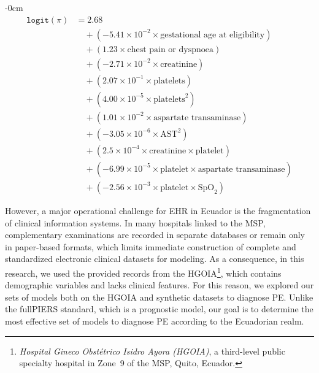 \documentclass[diagnostics,article,submit,pdftex,moreauthors]{Definitions/mdpi}
\begin{document}
\begin{linenomath}
\begin{adjustwidth}{-\extralength}{0cm}
\begin{equation}
  \begin{aligned}
    \texttt{logit}(\pi) &= 2.68 \\
              &\quad + (-5.41 \times 10^{-2} \times \text{gestational age at eligibility}) \\
              &\quad + (1.23 \times \text{chest pain or dyspnoea}) \\
              &\quad + (-2.71 \times 10^{-2} \times \text{creatinine}) \\
              &\quad + (2.07 \times 10^{-1} \times \text{platelets}) \\
              &\quad + (4.00 \times 10^{-5} \times \text{platelets}^2) \\
              &\quad + (1.01 \times 10^{-2} \times \text{aspartate transaminase}) \\
              &\quad + (-3.05 \times 10^{-6} \times \text{AST}^2) \\
              &\quad + (2.5 \times 10^{-4} \times \text{creatinine} \times \text{platelet}) \\
              &\quad + (-6.99 \times 10^{-5} \times \text{platelet} \times \text{aspartate transaminase}) \\
              &\quad + (-2.56 \times 10^{-3} \times \text{platelet} \times \text{SpO}_2)
  \end{aligned}
    \label{eq:fullpiers-logit}
\end{equation}
\end{adjustwidth}
\end{linenomath}

However, a major operational challenge for \ac{EHR} in Ecuador
is the fragmentation of clinical information systems. In many
hospitals linked to the \ac{MSP}, complementary examinations are
recorded in separate databases or remain only in paper-based formats,
which limits immediate construction of complete and standardized
electronic clinical datasets for modeling. As a consequence, in this
research, we used the provided records from the
\ac{HGOIA}\footnote{\textit{Hospital Gineco Obstétrico Isidro Ayora (HGOIA)}, a
  third-level public specialty hospital in Zone~9 of the \ac{MSP},
  Quito, Ecuador.}, which contains demographic variables and lacks
clinical features. For this reason, we explored our sets of models
both on the \ac{HGOIA} and synthetic datasets to diagnose
\ac{PE}.  Unlike the full\ac{PIERS} standard, which is a
prognostic model, our goal is to determine the most effective set of
models to diagnose \ac{PE} according to the Ecuadorian realm.
\end{document}
